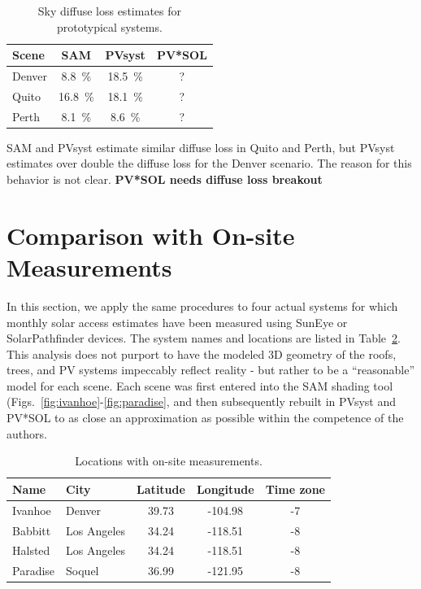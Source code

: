 \documentclass[twocolumn,10pt]{asme2ej}
\begin{document}
\begin{table}[h!]
\begin{center}
\begin{tabular}{lccc}
Scene & SAM & PVsyst & PV*SOL \\
\hline
Denver & 8.8~\% & 18.5~\% & ? \\
Quito  & 16.8~\% & 18.1~\% & ? \\
Perth  & 8.1~\% & 8.6~\% & ? \\
\end{tabular}
\caption{Sky diffuse loss estimates for prototypical systems.}
\label{tab:diffuse_loss}
\end{center}
\end{table}

SAM and PVsyst estimate similar diffuse loss in Quito and Perth, but PVsyst estimates over double the diffuse loss for the Denver scenario.  The reason for this behavior is not clear.  \textbf{PV*SOL needs diffuse loss breakout}



\section{Comparison with On-site Measurements}

In this section, we apply the same procedures to four actual systems for which monthly solar access estimates have been measured using SunEye or SolarPathfinder devices.  The system names and locations are listed in Table~\ref{tab:measured_system_names}.  This analysis does not purport to have the modeled 3D geometry of the roofs, trees, and PV systems impeccably reflect reality - but rather to be a ``reasonable'' model for each scene.  Each scene was first entered into the SAM shading tool (Figs.~\ref{fig:ivanhoe}-\ref{fig:paradise}, and then subsequently rebuilt in PVsyst and PV*SOL to as close an approximation as possible within the competence of the authors.

\begin{table}[h!]
\begin{center}
\begin{tabular}{llccc}
Name & City & Latitude & Longitude & Time zone \\
\hline
Ivanhoe & Denver & 39.73 & -104.98 & -7 \\
Babbitt & Los Angeles & 34.24 & -118.51 & -8 \\
Halsted & Los Angeles & 34.24 & -118.51 & -8 \\
Paradise & Soquel & 36.99 & -121.95 & -8 \\
\end{tabular}
\caption{Locations with on-site measurements.}
\label{tab:measured_system_names}
\end{center}
\end{table}
\end{document}
